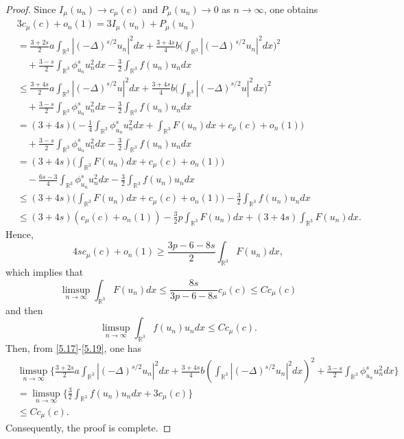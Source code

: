 \documentclass[reqno]{amsart}
\begin{document}
\begin{proof} 
Since $I_\mu(u_n)\to c_\mu(c)$ and $P_\mu(u_n)\to 0$ as $n \to \infty$, one obtains
\begin{equation}\label{5.17}
\begin{split}
&3c_\mu(c)+o_n {(1)}=3I_\mu(u_n)+P_\mu(u_n)\\
&= \frac{3+2s}{2}a\int_{\mathbb{R}^3}|(-\Delta)^{s/2}u_n|^2dx
+\frac{3+4s}{4}b\Big(\int_{\mathbb{R}^3}|(-\Delta)^{s/2}u_n|^2dx\Big)^2\\
&\quad +\frac{3-s}{2}\int_{\mathbb{R}^3}\phi^s_{u_n} u^2_ndx
 -\frac{3}{2}\int_{\mathbb{R}^3}f(u_n)u_ndx\\
&\leq  \frac{3+4s}{2}a\int_{\mathbb{R}^3}|(-\Delta)^{s/2}u|^2dx
+\frac{3+4s}{4}b\Big(\int_{\mathbb{R}^3}|(-\Delta)^{s/2}u|^2dx\Big)^2\\
&\quad +\frac{3-s}{2}\int_{\mathbb{R}^3}\phi^s_{u_n} u^2_ndx-\frac{3}{2}\int_{\mathbb{R}^3}f(u_n)u_ndx\\
&= (3+4s)\Big(-\frac{1}{4}\int_{\mathbb{R}^3}\phi^s_{u_n} u^2_ndx
 +\int_{\mathbb{R}^3}F(u_n)dx+c_\mu(c)+o_n(1)\Big)\\
&\quad +\frac{3-s}{2}\int_{\mathbb{R}^3}\phi^s_{u_n} u^2_ndx
 -\frac{3}{2}\int_{\mathbb{R}^3}f(u_n)u_ndx\\
&= (3+4s)\Big(\int_{\mathbb{R}^3}F(u_n)dx+c_\mu(c)+o_n(1)\Big)\\
&\quad -\frac{6s-3}{4}\int_{\mathbb{R}^3}\phi^s_{u_n} u^2_ndx-\frac{3}{2}\int_{\mathbb{R}^3}f(u_n)u_ndx\\
&\leq  (3+4s)\Big(\int_{\mathbb{R}^3}F(u_n)dx+c_\mu(c)+o_n(1)\Big)
 -\frac{3}{2}\int_{\mathbb{R}^3}f(u_n)u_ndx\\
&\leq  (3+4s)(c_\mu(c)+o_n(1))-\frac{3}{2}p\int_{\mathbb{R}^3}F(u_n)dx
 +(3+4s)\int_{\mathbb{R}^3}F(u_n)dx.
\end{split}
\end{equation}
Hence,
$$
4sc_\mu(c)+o_n(1)\geq \frac{3p-6-8s}{2}\int_{\mathbb{R}^3}F(u_n)dx,
$$
which implies that
\begin{equation}\label{5.18}
\limsup_{n\to \infty} \int_{\mathbb{R}^3}F(u_n)dx
\leq \frac{8s}{3p-6-8s}c_\mu(c) 
\leq C c_\mu(c)
\end{equation}
and then
\begin{equation}\label{5.19}
\limsup_{n\to \infty} \int_{\mathbb{R}^3}f(u_n)u_ndx \leq C c_\mu(c).
\end{equation}
Then, from \eqref{5.17}-\eqref{5.19}, one has
\begin{align*} %
&\limsup_{n\to \infty}\Big\{\frac{3+2s}{2}a
 \int_{\mathbb{R}^3}|(-\Delta)^{s/2}u_n|^2dx
 +\frac{3+4s}{4}b(\int_{\mathbb{R}^3}|(-\Delta)^{s/2}u_n|^2dx)^2
 +\frac{3-s}{2}\int_{\mathbb{R}^3}\phi^s_{u_n} u^2_ndx\Big\}\\
&= \limsup_{n\to \infty}\Big\{\frac{3}{2}\int_{\mathbb{R}^3}f(u_n)u_ndx+3c_\mu(c)\Big\}\\
&\leq  C c_\mu(c).
\end{align*}
Consequently, the proof is complete.
\end{proof}
\end{document}

